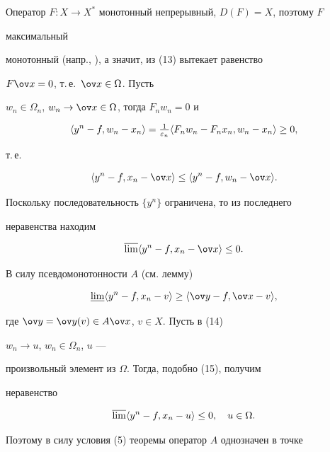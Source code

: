 Оператор $F:X\to X^*$ монотонный непрерывный, $D(F)=X$, поэтому $F$ 


максимальный 


монотонный (напр., \cite{4}), а значит, из (13) вытекает равенство 


$F\ov x=0$, т.\,е.~$\ov x\in\Omega$. Пусть 


$w_n\in\Omega_n$, $w_n\to\ov x\in\Omega$, тогда $F_n w_n=0$ и 


\begin{equation} 


\la y^n-f,w_n-x_n\ra=\tfrac{1}{\varepsilon_n} 


\la F_n w_n-F_n x_n,w_n-x_n\ra\ge 0, 


\end{equation} 


т.\,е. 


$$ 


\la y^n-f,x_n-\ov x\ra\le \la y^n-f,w_n-\ov x\ra. 


$$ 


Поскольку последовательность $\{y^n\}$ ограничена, то из последнего 


неравенства находим 


\begin{equation} 


\varlimsup\la y^n-f,x_n-\ov x\ra\le 0. 


\end{equation} 


В силу псевдомонотонности $A$ (см. лемму) 


\begin{equation} 


\varliminf\la y^n-f,x_n-v\ra\ge 


\la\ov y-f,\ov x-v\ra, 


\end{equation} 


где $\ov y=\ov y(v)\in A\ov x$, $v\in X$. Пусть в (14) 


$w_n\to u$, $w_n\in\Omega_n$, $u$ --- 


произвольный элемент из $\Omega$. Тогда, подобно (15), получим 


неравенство 


\begin{equation} 


\varlimsup\la y^n-f,x_n-u\ra\le 0,\quad u\in\Omega. 


\end{equation} 


Поэтому в силу условия (5) теоремы оператор $A$ однозначен в точке 


